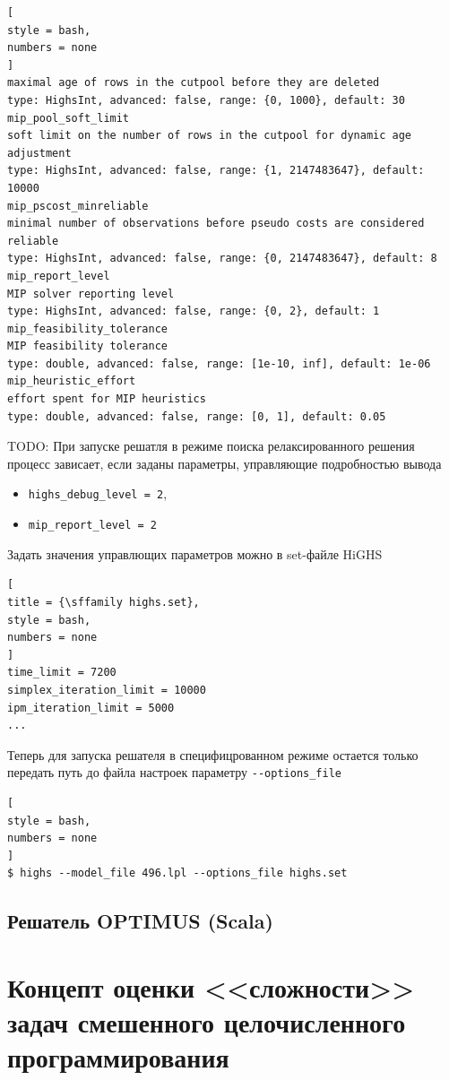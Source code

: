 \documentclass[%
	11pt,
	a4paper,
	utf8,
		]{article}
\begin{document}
\begin{lstlisting}[
style = bash,
numbers = none
]
maximal age of rows in the cutpool before they are deleted
type: HighsInt, advanced: false, range: {0, 1000}, default: 30
mip_pool_soft_limit
soft limit on the number of rows in the cutpool for dynamic age adjustment
type: HighsInt, advanced: false, range: {1, 2147483647}, default: 10000
mip_pscost_minreliable
minimal number of observations before pseudo costs are considered reliable
type: HighsInt, advanced: false, range: {0, 2147483647}, default: 8
mip_report_level
MIP solver reporting level
type: HighsInt, advanced: false, range: {0, 2}, default: 1
mip_feasibility_tolerance
MIP feasibility tolerance
type: double, advanced: false, range: [1e-10, inf], default: 1e-06
mip_heuristic_effort
effort spent for MIP heuristics
type: double, advanced: false, range: [0, 1], default: 0.05
\end{lstlisting}

{\noindent\color{red}TODO: При запуске решатля в режиме поиска релаксированного решения процесс зависает, если заданы параметры, управляющие подробностью вывода
\begin{itemize}
	\item \texttt{highs\_debug\_level = 2},
	
	\item  \texttt{mip\_report\_level = 2}
\end{itemize}
}

Задать значения управлющих параметров можно в set-файле HiGHS
\begin{lstlisting}[
title = {\sffamily highs.set},
style = bash,
numbers = none
]
time_limit = 7200
simplex_iteration_limit = 10000
ipm_iteration_limit = 5000
...
\end{lstlisting}

Теперь для запуска решателя в специфицрованном режиме остается только передать путь до файла настроек параметру \verb|--options_file|
\begin{lstlisting}[
style = bash,
numbers = none	
]
$ highs --model_file 496.lpl --options_file highs.set
\end{lstlisting}

\subsection{Решатель OPTIMUS (Scala)}

\section{Концепт оценки <<сложности>> задач смешенного целочисленного программирования}
\end{document}
